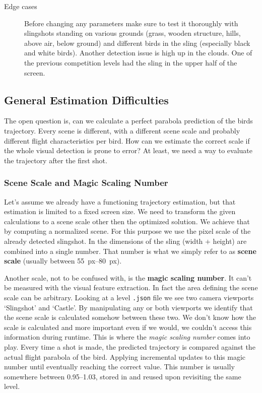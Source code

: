 \begin{description}
	\item[Edge cases] Before changing any parameters make sure to test it thoroughly with slingshots standing on various grounds (grass, wooden structure, hills, above air, below ground) and different birds in the sling (especially black and white birds). Another detection issue is high up in the clouds. One of the previous competition levels had the sling in the upper half of the screen.

\end{description}




\subsection{General Estimation Difficulties}

The open question is, can we calculate a perfect parabola prediction of the birds trajectory. Every scene is different, with a different scene scale and probably different flight characteristics per bird. How can we estimate the correct scale if the whole visual detection is prone to error? At least, we need a way to evaluate the trajectory after the first shot.


\subsubsection{Scene Scale and Magic Scaling Number}

Let's assume we already have a functioning trajectory estimation, but that estimation is limited to a fixed screen size. We need to transform the given calculations to a scene scale other then the optimized solution. We achieve that by computing a normalized scene. For this purpose we use the pixel scale of the already detected slingshot. In  the dimensions of the sling (width $+$ height) are combined into a single number. That number is what we simply refer to as \textbf{scene scale} (usually between \SIrange{55}{80}{px}).


Another scale, not to be confused with, is the \textbf{magic scaling number}. It can't be measured with the visual feature extraction. In fact the area defining the scene scale can be arbitrary. Looking at a level \texttt{.json} file we see two camera viewports `Slingshot' and `Castle'. By manipulating any or both viewports we identify that the scene scale is calculated somehow between these two. We don't know how the scale is calculated and more important even if we would, we couldn't access this information during runtime. This is where the \textit{magic scaling number} comes into play. Every time a shot is made, the predicted trajectory is compared against the actual flight parabola of the bird. Applying incremental updates to this magic number until eventually reaching the correct value. This number is usually somewhere between \numrange{0.95}{1.03}, stored in  and reused upon revisiting the same level.


